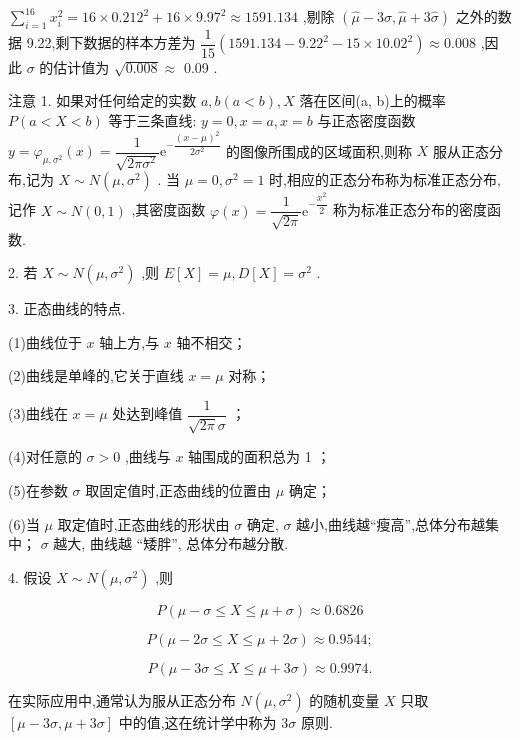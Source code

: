 $\mathop{\sum }\limits_{{i = 1}}^{{16}}{x}_{i}^{2} = {16} \times  {0.212}^{2} + {16} \times  {9.97}^{2} \approx  {1591.134}$ ,剔除 $\left( {\widehat{\mu } - 3\widehat{\sigma },\widehat{\mu } + 3\widehat{\sigma }}\right)$ 之外的数据 9.22,剩下数据的样本方差为 $\dfrac{1}{15}\left( {{1591.134} - {9.22}^{2} - {15} \times  {10.02}^{2}}\right)  \approx  {0.008}$ ,因此 $\sigma$ 的估计值为 $\sqrt{0.008} \approx$ 0.09 .

注意 1. 如果对任何给定的实数 $a,b\left( {a < b}\right) ,X$ 落在区间(a, b)上的概率 $P\left( {a < X < b}\right)$ 等于三条直线: $y = 0,x = a,x = b$ 与正态密度函数 $y = {\varphi }_{\mu ,{\sigma }^{2}}\left( x\right)  = \dfrac{1}{\sqrt{{2\pi }{\sigma }^{2}}}{\mathrm{e}}^{-\dfrac{{\left( x - \mu \right) }^{2}}{2{\sigma }^{2}}}$ 的图像所围成的区域面积,则称 $X$ 服从正态分布,记为 $X \sim  N\left( {\mu ,{\sigma }^{2}}\right)$ . 当 $\mu  = 0,{\sigma }^{2} = 1$ 时,相应的正态分布称为标准正态分布,记作 $X \sim  N\left( {0,1}\right)$ ,其密度函数 $\varphi \left( x\right)  = \dfrac{1}{\sqrt{2\pi }}{\mathrm{e}}^{-\dfrac{{x}^{2}}{2}}$ 称为标准正态分布的密度函数.

2. 若 $X \sim  N\left( {\mu ,{\sigma }^{2}}\right)$ ,则 $E\left\lbrack  X\right\rbrack   = \mu ,D\left\lbrack  X\right\rbrack   = {\sigma }^{2}$ .

3. 正态曲线的特点.

(1)曲线位于 $x$ 轴上方,与 $x$ 轴不相交；

(2)曲线是单峰的,它关于直线 $x = \mu$ 对称；

(3)曲线在 $x = \mu$ 处达到峰值 $\dfrac{1}{\sqrt{2\pi }\sigma }$ ；

(4)对任意的 $\sigma  > 0$ ,曲线与 $x$ 轴围成的面积总为 1 ；

(5)在参数 $\sigma$ 取固定值时,正态曲线的位置由 $\mu$ 确定；

(6)当 $\mu$ 取定值时,正态曲线的形状由 $\sigma$ 确定, $\sigma$ 越小,曲线越“瘦高”,总体分布越集中； $\sigma$ 越大, 曲线越 “矮胖”, 总体分布越分散.

4. 假设 $X \sim  N\left( {\mu ,{\sigma }^{2}}\right)$ ,则

\[
P\left( {\mu  - \sigma  \leq  X \leq  \mu  + \sigma }\right)  \approx  {0.6826}
\]

\[
P\left( {\mu  - {2\sigma } \leq  X \leq  \mu  + {2\sigma }}\right)  \approx  {0.9544};
\]

\[
P\left( {\mu  - {3\sigma } \leq  X \leq  \mu  + {3\sigma }}\right)  \approx  {0.9974}.
\]

在实际应用中,通常认为服从正态分布 $N\left( {\mu ,{\sigma }^{2}}\right)$ 的随机变量 $X$ 只取 $\left\lbrack  {\mu  - {3\sigma },\mu  + {3\sigma }}\right\rbrack$ 中的值,这在统计学中称为 ${3\sigma }$ 原则.

